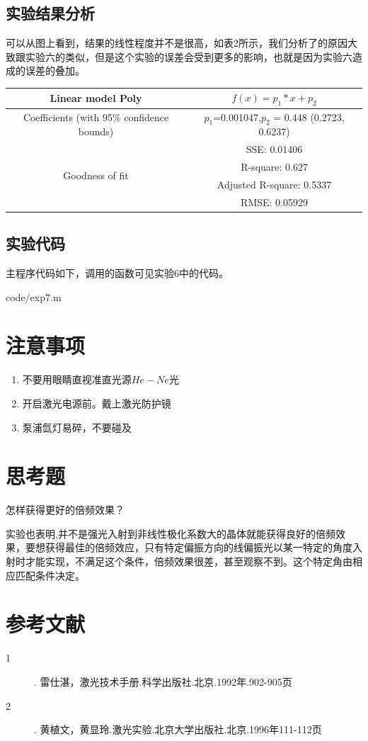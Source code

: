 \documentclass[UTF8]{ctexart}
\makeatletter
\newcommand{\tabcaption}{\def\@captype{table}\caption}
\makeatother
\begin{document}
\subsection{实验结果分析}
	可以从图上看到，结果的线性程度并不是很高，如表2所示，我们分析了的原因大致跟实验六的类似，但是这个实验的误差会受到更多的影响，也就是因为实验六造成的误差的叠加。
	\begin{center}
		\tabcaption{拟合后曲线的参数}
		\begin{tabular}{|c|c|}
			\hline
			Linear model Poly&$f(x) = p_{1}*x + p_{2}$\\ \hline
			Coefficients (with 95\% confidence bounds)& $p_{1}$=0.001047,$p_{2}$ =  0.448  (0.2723, 0.6237)\\ \hline
			\multirow{4}{*}{Goodness of fit}&SSE: 0.01406\\
			&R-square: 0.627\\
			&Adjusted R-square: 0.5337\\
			&RMSE: 0.05929\\ \hline
		\end{tabular}
	\end{center}
\subsection{实验代码}
主程序代码如下，调用的函数可见实验6中的代码。
	
{code/exp7.m}
\section{注意事项}
\begin{enumerate}
	\item 不要用眼睛直视准直光源$He-Ne$光
	\item 开启激光电源前。戴上激光防护镜
	\item 泵浦氙灯易碎，不要碰及
\end{enumerate}
\section{思考题}
怎样获得更好的倍频效果？

实验也表明,并不是强光入射到非线性极化系数大的晶体就能获得良好的倍频效果，要想获得最佳的倍频效应，只有特定偏振方向的线偏振光以某一特定的角度入射时才能实现，不满足这个条件，倍频效果很差，甚至观察不到。这个特定角由相应匹配条件决定。
\section{参考文献}
\begin{description}
\item[1]. 雷仕湛，激光技术手册.科学出版社.北京.1992年.902-905页
\item[2]. 黄植文，黄显玲.激光实验.北京大学出版社.北京.1996年111-112页
\end{description}
\end{document}

